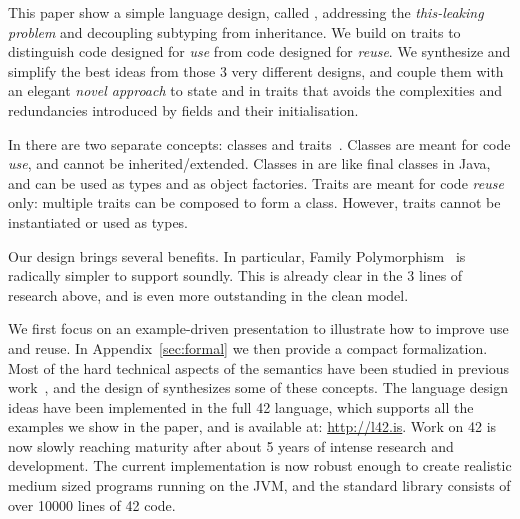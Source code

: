 This paper show a simple language design, called \name,
addressing the \emph{this-leaking problem} and decoupling subtyping from inheritance.
We build on traits to distinguish code designed for
\emph{use} from code designed for \emph{reuse}.
We synthesize and simplify the best ideas from those 3 very different designs, and couple them with an elegant \emph{novel approach} to state and  in traits that avoids the complexities and redundancies introduced by fields and their initialisation.

In \name there are two separate concepts: classes
and traits~\cite{ducasse2006traits}. Classes are meant for code \emph{use}, and cannot be inherited/extended. Classes in \name are like final classes in
Java, and can be used as types and as object factories. Traits are meant for code \emph{reuse} only: multiple traits can be
composed to form a class. However, traits 
cannot be instantiated or used as types.


Our design brings several benefits. In particular, 
Family Polymorphism~\cite{ernst2004expression} is
radically simpler to support soundly.
This is already clear in the 3 lines of
research above, and is even more outstanding in the clean \name model.

We first focus on an example-driven presentation to illustrate how to
improve use and reuse. 
In Appendix~\ref{sec:formal} we then provide a compact formalization.
Most of the hard technical aspects of the
semantics have been studied in previous 
work~\cite{Bettini:2010:ISP:1774088.1774530,BETTINI2013521,Bettini2015282,KrogdahlMS09,DBLP:journals/taosd/AxelsenSKM12,DBLP:conf/gpce/AxelsenK12,deep,servetto2014meta,fjig},
and the design of \name synthesizes some of these concepts.
The language design ideas have been implemented in the full 42 language, which supports all
the examples we show in the paper, and is available at: \url{http://l42.is}.
Work on 42 is now slowly reaching maturity after about 5 years of
intense research and development. The current implementation 
is now robust enough to create realistic medium sized programs running 
on the JVM, and the standard library consists of over 10000 lines of
42 code. 

